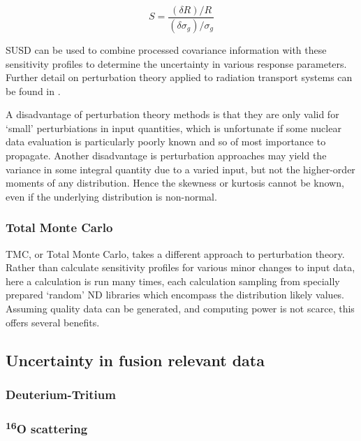 \begin{equation}
  \label{eq:sensitivity}
  S = \frac{(\delta R)/R}{(\delta \sigma_{g}) / \sigma_{g}}
\end{equation}

SUSD can be used to combine processed covariance information with these sensitivity profiles to determine the uncertainty in various response parameters. Further detail on perturbation theory applied to radiation transport systems can be found in \cite{Sabouri2013}.

A disadvantage of perturbation theory methods is that they are only valid for `small' perturbiations in input quantities, which is unfortunate if some nuclear data evaluation is particularly poorly known and so of most importance to propagate. Another disadvantage is perturbation approaches may yield the variance in some integral quantity due to a varied input, but not the higher-order moments of any distribution. Hence the skewness or kurtosis cannot be known, even if the underlying distribution is non-normal.


\subsubsection{Total Monte Carlo}
TMC, or Total Monte Carlo, takes a different approach to perturbation theory. Rather than calculate sensitivity profiles for various minor changes to input data, here a calculation is run many times, each calculation sampling from specially prepared `random' ND libraries which encompass the distribution likely values. Assuming quality data can be generated, and computing power is not scarce, this offers several benefits. 

\subsection{Uncertainty in fusion relevant data}
  \cite{Forrest2011}
\subsubsection{Deuterium-Tritium}
\subsubsection{\textsuperscript{16}O scattering}
